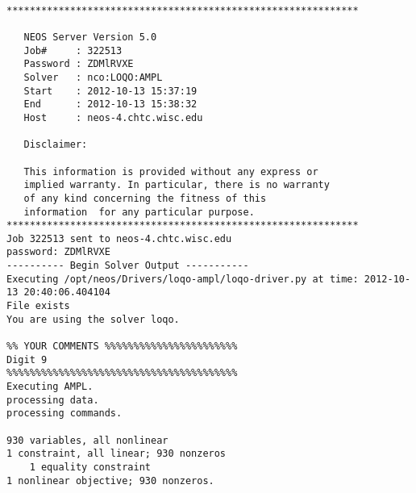 \documentclass{article}
\begin{document}
\begin{verbatim}

*************************************************************

   NEOS Server Version 5.0
   Job#     : 322513
   Password : ZDMlRVXE
   Solver   : nco:LOQO:AMPL
   Start    : 2012-10-13 15:37:19
   End      : 2012-10-13 15:38:32
   Host     : neos-4.chtc.wisc.edu

   Disclaimer:

   This information is provided without any express or
   implied warranty. In particular, there is no warranty
   of any kind concerning the fitness of this
   information  for any particular purpose.
*************************************************************
Job 322513 sent to neos-4.chtc.wisc.edu
password: ZDMlRVXE
---------- Begin Solver Output -----------
Executing /opt/neos/Drivers/loqo-ampl/loqo-driver.py at time: 2012-10-13 20:40:06.404104
File exists
You are using the solver loqo.

%% YOUR COMMENTS %%%%%%%%%%%%%%%%%%%%%%%
Digit 9
%%%%%%%%%%%%%%%%%%%%%%%%%%%%%%%%%%%%%%%%
Executing AMPL.
processing data.
processing commands.

930 variables, all nonlinear
1 constraint, all linear; 930 nonzeros
	1 equality constraint
1 nonlinear objective; 930 nonzeros.


\end{verbatim}
\end{document}
